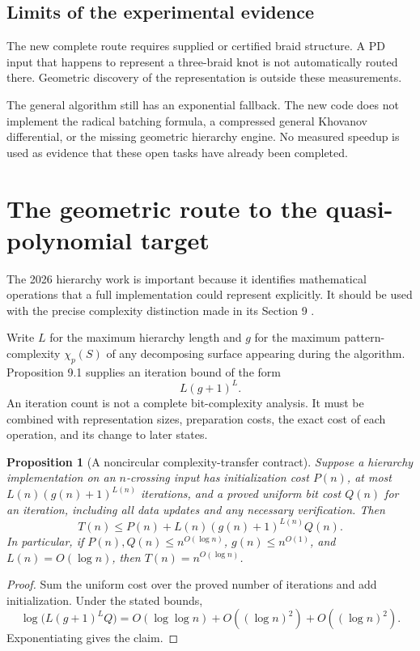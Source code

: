 \documentclass[11pt,letterpaper]{article}
\newtheorem{proposition}[theorem]{Proposition}
\theoremstyle{definition}
\begin{document}
\subsection{Limits of the experimental evidence}

The new complete route requires supplied or certified braid structure.
A PD input that happens to represent a three-braid knot is not
automatically routed there. Geometric discovery of the representation
is outside these measurements.

The general algorithm still has an exponential fallback. The new code
does not implement the radical batching formula, a compressed general
Khovanov differential, or the missing geometric hierarchy engine.
No measured speedup is used as evidence that these open tasks have
already been completed.

\section{The geometric route to the quasi-polynomial target}
\label{sec:hierarchy}

The 2026 hierarchy work is important because it identifies mathematical
operations that a full implementation could represent explicitly.
It should be used with the precise complexity distinction made in its
Section 9 \cite{lackenby2026}.

Write \(L\) for the maximum hierarchy length and \(g\) for the maximum
pattern-complexity \(\chi_p(S)\) of any decomposing surface appearing
during the algorithm. Proposition 9.1 supplies an
iteration bound of the form
\[
                         L(g+1)^L.
\]
An iteration count is not a complete bit-complexity analysis.
It must be combined with representation sizes, preparation costs,
the exact cost of each operation, and its change to later states.

\begin{proposition}[A noncircular complexity-transfer contract]
\label{prop:hierarchy}
Suppose a hierarchy implementation on an \(n\)-crossing input has
initialization cost \(P(n)\), at most \(L(n)(g(n)+1)^{L(n)}\)
iterations, and a proved uniform bit cost \(Q(n)\) for an iteration,
including all data updates and any necessary verification.
Then
\[
 T(n)\le P(n)+L(n)(g(n)+1)^{L(n)}Q(n).
\]
In particular, if \(P(n),Q(n)\le n^{O(\log n)}\),
\(g(n)\le n^{O(1)}\), and \(L(n)=O(\log n)\), then
\(T(n)=n^{O(\log n)}\).
\end{proposition}
\begin{proof}
Sum the uniform cost over the proved number of iterations and add
initialization. Under the stated bounds,
\[
 \log\!\bigl(L(g+1)^LQ\bigr)
    =O(\log\log n)+O((\log n)^2)+O((\log n)^2).
\]
Exponentiating gives the claim.
\end{proof}
\end{document}
